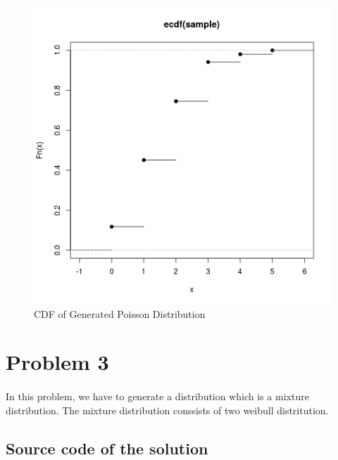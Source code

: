 \documentclass{article}
\begin{document}
		\begin{figure}[!ht]
  			\includegraphics[width=\linewidth]{pic/que2_cdf.png}
 			 \caption{CDF of Generated Poisson Distribution}
  			\label{fig:hist1}
		\end{figure}
		
		\clearpage
		

			
	\section{Problem 3}
		\paragraph{}
			In this problem, we have to generate a distribution which is a mixture distribution. The mixture distribution conssists of two weibull distritution.
			
			
		\subsection{Source code of the solution}
			
			
\end{document}
